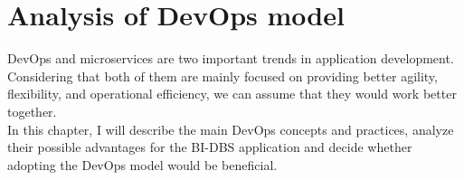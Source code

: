 \chapter{Analysis of DevOps model} DevOps and microservices are two important trends in application development. Considering that both of them are mainly focused on providing better agility, flexibility, and operational efficiency, we can assume that they would work better together.\cite{devops-micr}\\ 
In this chapter, I will describe the main DevOps concepts and practices, analyze their possible advantages for the BI-DBS application and decide whether adopting the DevOps model would be beneficial. 
















% 


